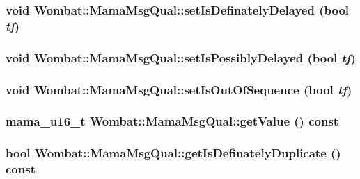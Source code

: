 \label{classWombat_1_1MamaMsgQual_aee0b5012d3ed45fa27c6d00f20f533d2}
\hypertarget{classWombat_1_1MamaMsgQual_aac859f1f88c3b32c799c31d010d70c7a}{
\subsubsection[{setIsDefinatelyDelayed}]{\setlength{\rightskip}{0pt plus 5cm}void Wombat::MamaMsgQual::setIsDefinatelyDelayed (bool {\em tf})}}
\label{classWombat_1_1MamaMsgQual_aac859f1f88c3b32c799c31d010d70c7a}
\hypertarget{classWombat_1_1MamaMsgQual_a19b744e573c3920eb43a4e7b3e51e7ae}{
\subsubsection[{setIsPossiblyDelayed}]{\setlength{\rightskip}{0pt plus 5cm}void Wombat::MamaMsgQual::setIsPossiblyDelayed (bool {\em tf})}}
\label{classWombat_1_1MamaMsgQual_a19b744e573c3920eb43a4e7b3e51e7ae}
\hypertarget{classWombat_1_1MamaMsgQual_acd4334a4d5b6c0e4fc558182e7f899f5}{
\subsubsection[{setIsOutOfSequence}]{\setlength{\rightskip}{0pt plus 5cm}void Wombat::MamaMsgQual::setIsOutOfSequence (bool {\em tf})}}
\label{classWombat_1_1MamaMsgQual_acd4334a4d5b6c0e4fc558182e7f899f5}
\hypertarget{classWombat_1_1MamaMsgQual_a3234dc63e2d987863a5c4a423c781e55}{
\subsubsection[{getValue}]{\setlength{\rightskip}{0pt plus 5cm}mama\_\-u16\_\-t Wombat::MamaMsgQual::getValue () const}}
\label{classWombat_1_1MamaMsgQual_a3234dc63e2d987863a5c4a423c781e55}
\hypertarget{classWombat_1_1MamaMsgQual_a4fadea109baf034c7639e0b31814835d}{
\subsubsection[{getIsDefinatelyDuplicate}]{\setlength{\rightskip}{0pt plus 5cm}bool Wombat::MamaMsgQual::getIsDefinatelyDuplicate () const}}
